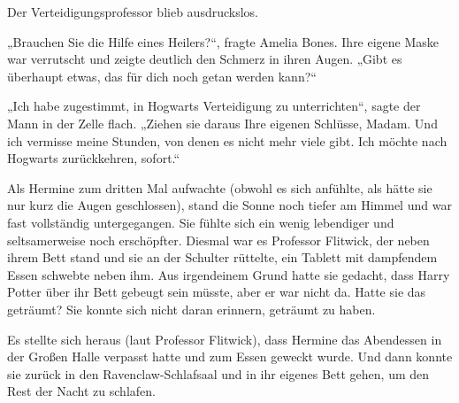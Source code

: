 Der Verteidigungsprofessor blieb ausdruckslos.

„Brauchen Sie die Hilfe eines Heilers?“, fragte Amelia Bones.
Ihre eigene Maske war verrutscht und zeigte deutlich den Schmerz in ihren Augen. „Gibt es überhaupt etwas, das für dich noch getan werden kann?“

„Ich habe zugestimmt, in Hogwarts Verteidigung zu unterrichten“, sagte der Mann in der Zelle flach. „Ziehen sie daraus Ihre eigenen Schlüsse, Madam. Und ich vermisse meine Stunden, von denen es nicht mehr viele gibt. Ich möchte nach Hogwarts zurückkehren, sofort.“

\later

Als Hermine zum dritten Mal aufwachte (obwohl es sich anfühlte, als hätte sie nur kurz die Augen geschlossen), stand die Sonne noch tiefer am Himmel und war fast vollständig untergegangen. Sie fühlte sich ein wenig lebendiger und seltsamerweise noch erschöpfter. Diesmal war es Professor Flitwick, der neben ihrem Bett stand und sie an der Schulter rüttelte, ein Tablett mit dampfendem Essen schwebte neben ihm. Aus irgendeinem Grund hatte sie gedacht, dass Harry Potter über ihr Bett gebeugt sein müsste, aber er war nicht da.
Hatte sie das geträumt? Sie konnte sich nicht daran erinnern, geträumt zu haben.

Es stellte sich heraus (laut Professor Flitwick), dass Hermine das Abendessen in der Großen Halle verpasst hatte und zum Essen geweckt wurde. Und dann konnte sie zurück in den Ravenclaw-Schlafsaal und in ihr eigenes Bett gehen, um den Rest der Nacht zu schlafen.

